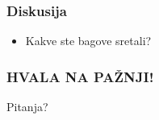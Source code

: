 \documentclass{beamer}
\begin{document}
\begin{frame}
    \frametitle{Diskusija}
    \begin{itemize}
        \item Kakve ste bagove sretali?
    \end{itemize}
\end{frame}

\begin{frame}
    \frametitle{HVALA NA PAŽNJI!}
    \begin{center}
        \Huge Pitanja?    
    \end{center}
    

    

\end{frame}
\end{document}

